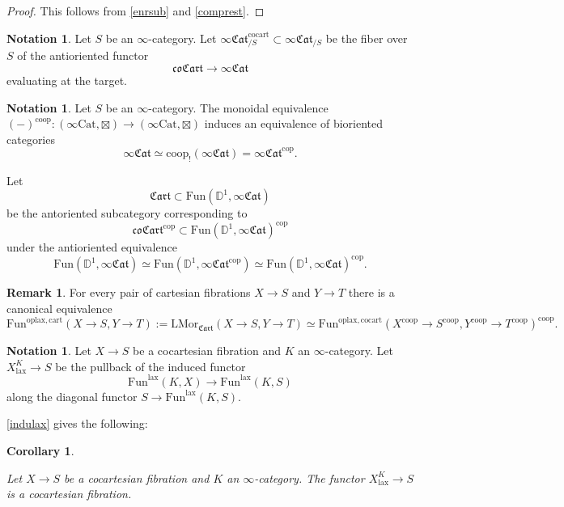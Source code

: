 \documentclass[10pt,oneside]{article}
\numberwithin{equation}{section} %
\numberwithin{figure}{section} %
\theoremstyle{plain}
\newtheorem{corollary}[theorem]{Corollary}
\theoremstyle{definition}
\newtheorem{notation}[theorem]{Notation}
\newtheorem{remark}[theorem]{Remark}
\newcommand{\bD}{{\mathbb D}}
\renewcommand{\L}{{\mathrm L}}
\newcommand{\Cat}{\mathrm{Cat}}
\newcommand{\Fun}{\mathrm{Fun}}
\newcommand{\cocart}{{\mathrm{cocart}}}
\newcommand{\cart}{{\mathrm{cart}}}
\newcommand{\lax}{{\mathrm{lax}}}
\newcommand{\oplax}{{\mathrm{oplax}}}
\newcommand{\coop}{\mathrm{coop}}
\newcommand{\Mor}{{\mathrm{Mor}}}
\newcommand{\cop}{\mathrm{cop}}
\newcommand{\fcat}{\mathfrak{Cat}}
\begin{document}
\begin{proof}
This follows from \cref{enrsub} and \cref{comprest}.
\end{proof}

\begin{notation}

Let $S$ be an $\infty$-category.
Let $\infty\fcat^\cocart_{/S} \subset \infty\fcat_{/S}$ be the fiber over $S$ of the antioriented functor
$$\mathfrak{coCart} \to \infty\fcat $$ evaluating at the target.
    
\end{notation}

\begin{notation}

Let $S$ be an $\infty$-category.
The monoidal equivalence $(-)^\coop: (\infty\Cat, \boxtimes) \to (\infty\Cat, \boxtimes) $
induces an equivalence of bioriented categories
$$ \infty\fcat \simeq \coop_!(\infty\fcat) = \infty\fcat^\cop.$$

Let $$\mathfrak{Cart} \subset \Fun(\bD^1, \infty\mathfrak{Cat})$$
be the antoriented subcategory corresponding to
$$\mathfrak{coCart}^\cop \subset \Fun(\bD^1, \infty\mathfrak{Cat})^\cop $$
under the antioriented equivalence
$$ \Fun(\bD^1, \infty\mathfrak{Cat}) \simeq \Fun(\bD^1, \infty\mathfrak{Cat}^\cop) \simeq \Fun(\bD^1, \infty\mathfrak{Cat})^\cop.$$
    
\end{notation}

\begin{remark}

For every pair of cartesian fibrations $X \to S$ and $Y \to T$
there is a canonical equivalence
$$ \Fun^{\oplax,\cart}(X \to S, Y\to T):= \L\Mor_{\mathfrak{Cart}}(X \to S, Y \to T) \simeq \Fun^{\oplax,\cocart}(X^\coop \to S^\coop, Y^\coop\to T^\coop)^\coop.$$

\end{remark}

\begin{notation}
Let $X \to S$ be a cocartesian fibration
and $K$ an $\infty$-category.
Let $X^K_\lax \to S $ be the pullback of the induced functor
$$ \Fun^\lax(K,X) \to \Fun^\lax(K,S) $$
along the diagonal functor $S \to \Fun^\lax(K,S). $

\end{notation}

\cref{indulax} gives the following:

\begin{corollary}\label{restcoca}

Let $X \to S$ be a cocartesian fibration
and $K$ an $\infty$-category.
The functor $X^K_\lax \to S $ is a cocartesian fibration.
   
\end{corollary}
\end{document}
